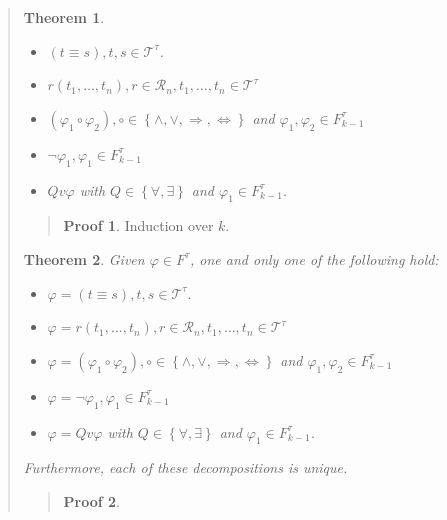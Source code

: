 \documentclass[a4paper, 12pt]{article}
\newtheorem{theorem}{Theorem}
\theoremstyle{definition}
\theoremstyle{definition}
\theoremstyle{definition}
\newtheorem{pro}{Proof}
\begin{document}
\begin{quote}
\begin{theorem}
    \begin{itemize}
        \item $(t \equiv s), t, s \in \mathcal{T}^\tau$.
        \item $r(t_1, \ldots, t_n), r \in \mathcal{R}_n, t_1, \ldots, t_n \in \mathcal{T}^\tau$
        \item $(\varphi_1 \circ \varphi_2), \circ \in \left\{ \land , \lor , \Rightarrow, \iff \right\} $ and $\varphi_1, \varphi_2 \in  F_{k-1}^{\tau}$
        \item $\neg \varphi_1, \varphi_1 \in F_{k-1}^{\tau}$
        \item $Q v \varphi$ with $Q \in \left\{ \forall , \exists  \right\} $ and $\varphi_1 \in F_{k-1}^{\tau}$.
    \end{itemize}
\end{theorem}


\small
\begin{quote}

\begin{pro}
    Induction over $k$.
\end{pro}

\end{quote}
\normalsize

\begin{theorem}
    Given $\varphi \in F^\tau$, one and only one of the following hold: 

    \begin{itemize}
        \item $\varphi = (t \equiv s), t, s \in \mathcal{T}^\tau$.
        \item $\varphi = r(t_1, \ldots, t_n), r \in \mathcal{R}_n, t_1, \ldots, t_n \in \mathcal{T}^\tau$
        \item $\varphi = (\varphi_1 \circ \varphi_2), \circ \in \left\{ \land , \lor , \Rightarrow, \iff \right\} $ and $\varphi_1, \varphi_2 \in  F_{k-1}^{\tau}$
        \item $\varphi = \neg \varphi_1, \varphi_1 \in F_{k-1}^{\tau}$
        \item $\varphi = Q v \varphi$ with $Q \in \left\{ \forall , \exists  \right\} $ and $\varphi_1 \in F_{k-1}^{\tau}$.
    \end{itemize}

    Furthermore, each of these decompositions is unique.
\end{theorem}


\small
\begin{quote}

\begin{pro}


\end{pro}
\end{quote}
\end{quote}
\end{document}
